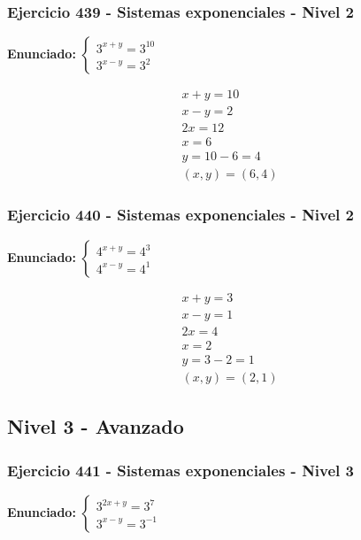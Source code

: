 \documentclass[12pt,a4paper]{article}
\begin{document}
\subsubsection*{Ejercicio 439 - Sistemas exponenciales - Nivel 2}
\textbf{Enunciado:} \(\begin{cases} 3^{x+y}=3^{10}\\ 3^{x-y}=3^{2}\end{cases}\)

\[
\begin{aligned}
x+y=10\\
x-y=2\\
2x=12\\
x=6\\
y=10-6=4\\
\boxed{(x,y)=(6,4)}
\end{aligned}
\]


\subsubsection*{Ejercicio 440 - Sistemas exponenciales - Nivel 2}
\textbf{Enunciado:} \(\begin{cases} 4^{x+y}=4^{3}\\ 4^{x-y}=4^{1}\end{cases}\)

\[
\begin{aligned}
x+y=3\\
x-y=1\\
2x=4\\
x=2\\
y=3-2=1\\
\boxed{(x,y)=(2,1)}
\end{aligned}
\]


\newpage

\subsection*{Nivel 3 - Avanzado}

\subsubsection*{Ejercicio 441 - Sistemas exponenciales - Nivel 3}
\textbf{Enunciado:} \(\begin{cases} 3^{2x+y}=3^{7}\\ 3^{x-y}=3^{-1}\end{cases}\)
\end{document}
